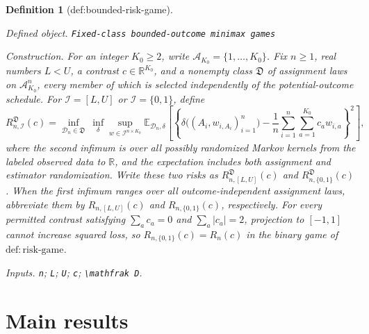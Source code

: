 \documentclass{article}
\newtheorem{definition}{Definition}
\begin{document}
\begin{definition}[def:bounded-risk-game]\label{def:bounded-risk-game}
\par\smallskip\noindent\emph{Defined object.} \texttt{Fixed-\allowbreak{}class bounded-\allowbreak{}outcome minimax games}
\par\smallskip\noindent\emph{Construction.} For an integer \(K_0\ge2\), write \(\mathcal A_{K_0}=\{1,\ldots,K_0\}\).  Fix \(n\ge1\), real numbers \(L<U\), a contrast \(c\in\mathbb R^{K_0}\), and a nonempty class \(\mathfrak D\) of assignment laws on \(\mathcal A_{K_0}^n\), every member of which is selected independently of the potential-outcome schedule.  For \(\mathcal I=[L,U]\) or \(\mathcal I=\{0,1\}\), define
\[
 R^{\mathfrak D}_{n,\mathcal I}(c)
 =\inf_{\mathcal D_n\in\mathfrak D}\ \inf_{\delta}
   \sup_{w\in\mathcal I^{n\times K_0}}
   \mathbb E_{\mathcal D_n,\delta}\!\left[
   \left\{\delta\bigl((A_i,w_{i,A_i})_{i=1}^n\bigr)
   -\frac1n\sum_{i=1}^n\sum_{a=1}^{K_0}c_aw_{i,a}
   \right\}^2\right],
\]
where the second infimum is over all possibly randomized Markov kernels from the labeled observed data to \(\mathbb R\), and the expectation includes both assignment and estimator randomization.  Write these two risks as \(R^{\mathfrak D}_{n,[L,U]}(c)\) and \(R^{\mathfrak D}_{n,\{0,1\}}(c)\).  When the first infimum ranges over all outcome-independent assignment laws, abbreviate them by \(R_{n,[L,U]}(c)\) and \(R_{n,\{0,1\}}(c)\), respectively.  For every permitted contrast satisfying \(\sum_ac_a=0\) and \(\sum_a|c_a|=2\), projection to \([-1,1]\) cannot increase squared loss, so \(R_{n,\{0,1\}}(c)=R_n(c)\) in the binary game of \(\mathrm{def:risk\text{-}game}\).
\par\smallskip\noindent\emph{Inputs.} \texttt{n}; \texttt{L}; \texttt{U}; \texttt{c}; \texttt{\textbackslash{}\allowbreak{}mathfrak D}.
\end{definition}

\section{Main results}
\end{document}
